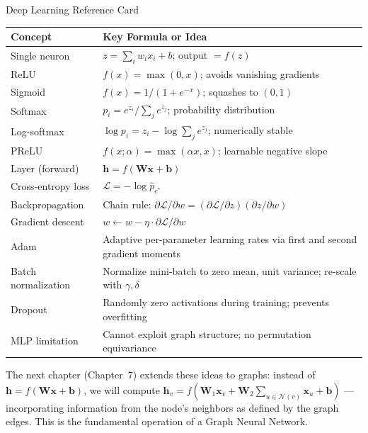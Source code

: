 \begin{mathbox}{Deep Learning Reference Card}
\renewcommand{\arraystretch}{1.4}
\begin{tabular}{p{3.8cm}p{9.5cm}}
\toprule
\textbf{Concept} & \textbf{Key Formula or Idea} \\
\midrule
Single neuron & $z = \sum_i w_i x_i + b$; output $= f(z)$ \\
ReLU & $f(x) = \max(0, x)$; avoids vanishing gradients \\
Sigmoid & $f(x) = 1/(1+e^{-x})$; squashes to $(0,1)$ \\
Softmax & $p_i = e^{z_i}/\sum_j e^{z_j}$; probability distribution \\
Log-softmax & $\log p_i = z_i - \log \sum_j e^{z_j}$; numerically stable \\
PReLU & $f(x;\alpha) = \max(\alpha x, x)$; learnable negative slope \\
Layer (forward) & $\mathbf{h} = f(\mathbf{W}\mathbf{x} + \mathbf{b})$ \\
Cross-entropy loss & $\mathcal{L} = -\log \hat{p}_{c^*}$ \\
Backpropagation & Chain rule: $\partial \mathcal{L}/\partial w = (\partial \mathcal{L}/\partial z)(\partial z/\partial w)$ \\
Gradient descent & $w \leftarrow w - \eta \cdot \partial\mathcal{L}/\partial w$ \\
Adam & Adaptive per-parameter learning rates via first and second gradient moments \\
Batch normalization & Normalize mini-batch to zero mean, unit variance; re-scale with $\gamma, \delta$ \\
Dropout & Randomly zero activations during training; prevents overfitting \\
MLP limitation & Cannot exploit graph structure; no permutation equivariance \\
\bottomrule
\end{tabular}
\end{mathbox}

The next chapter (Chapter~7) extends these ideas to graphs: instead of $\mathbf{h} = f(\mathbf{W}\mathbf{x} + \mathbf{b})$, we will compute $\mathbf{h}_v = f\!\left(\mathbf{W}_1 \mathbf{x}_v + \mathbf{W}_2 \sum_{u \in \mathcal{N}(v)} \mathbf{x}_u + \mathbf{b}\right)$ --- incorporating information from the node's neighbors as defined by the graph edges. This is the fundamental operation of a Graph Neural Network.
